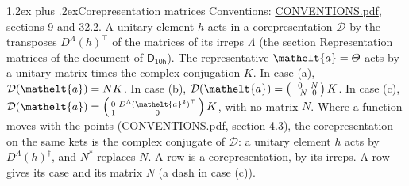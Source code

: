 \documentclass[10pt,a4paper]{article}
\makeatletter
\renewcommand\section{\@startsection{section}{1}{\z@}{-3ex plus -1ex minus -.2ex}%
  {1.2ex plus .2ex}{\normalfont\large\sffamily\bfseries\color{parttitle}}}
\numberwithin{equation}{section}
\newcommand{\eltfont}[1]{{\let\sigma\eltsigma\mathelt{#1}}}
\newcommand{\grp}[1]{\mathsf{#1}}
\newcommand{\elt}[1]{\eltfont{#1}}
\makeatother
\begin{document}
\section{Corepresentation matrices}\label{s:corep_matrices}
Conventions: \href{../../CONVENTIONS.pdf}{CONVENTIONS.pdf}, sections \href{../../../rotation/CONVENTIONS.pdf\#conv.9}{9} and \href{../../CONVENTIONS.pdf\#conv.32.2}{32.2}.
A unitary element $h$ acts in a corepresentation $\mathcal{D}$ by the transposes $D^{\Lambda}(h)^{\top}$ of the matrices of its irreps $\Lambda$ (the section Representation matrices of the document of \href{../../../rotation/data/pdf/D10h.pdf}{$\grp{D_{10h}}$}). The representative $\elt{a} = \varTheta$ acts by a unitary matrix times the complex conjugation $K$.
In case (a), $\mathcal{D}(\elt{a}) = NK$. In case (b), $\mathcal{D}(\elt{a}) = \left(\begin{smallmatrix} 0 & N \\ -N & 0 \end{smallmatrix}\right) K$. In case (c), $\mathcal{D}(\elt{a}) = \left(\begin{smallmatrix} 0 & D^{\Lambda}(\elt{a}^2)^{\top} \\ 1 & 0 \end{smallmatrix}\right) K$, with no matrix $N$.
Where a function moves with the points (\href{../../CONVENTIONS.pdf}{CONVENTIONS.pdf}, section \href{../../../rotation/CONVENTIONS.pdf\#conv.4.3}{4.3}), the corepresentation on the same kets is the complex conjugate of $\mathcal{D}$: a unitary element $h$ acts by $D^{\Lambda}(h)^{\dagger}$, and $N^{*}$ replaces $N$.
A row is a corepresentation, by its irreps. A row gives its case and its matrix $N$ (a dash in case (c)).
\end{document}
